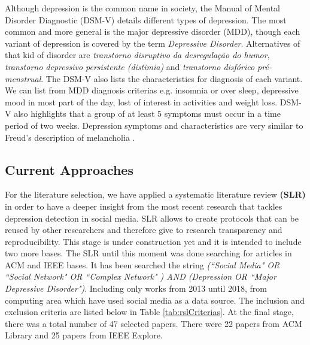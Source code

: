 \documentclass[11pt, notitlepage]{article} %
\begin{document}
Although depression is the common name in society, the Manual of Mental Disorder Diagnostic (DSM-V) details different types of depression. The most common and more general is the major depressive disorder (MDD), though each variant of depression is covered by the term \textit{Depressive Disorder}. Alternatives of that kid of disorder are \textit{transtorno disruptivo da desregulação do humor}, \textit{transtorno depressivo persistente (distimia)} and \textit{transtorno disfórico pré-menstrual}. The DSM-V also lists the characteristics for diagnosis of each variant. We can list from MDD diagnosis criterias e.g. insomnia or over sleep, depressive mood in most part of the day, lost of interest in activities and weight loss. DSM-V also highlights that a group of at least 5 symptoms must occur in a time period of two weeks.
Depression symptoms and characteristics are very similar to Freud's description of melancholia \cite{freud1917mourning}. 

\subsection{Current Approaches}\label{subsec:srl}
For the literature selection, we have applied a systematic literature review \textbf{(SLR)} in order to have a deeper insight from the most recent research that tackles depression detection in social media. 
SLR allows to create protocols that can be reused by other researchers and therefore give to research transparency and reproducibility.
This stage is under construction yet and it is intended to include two more bases. The SLR until this moment was done searching for articles in ACM and IEEE bases. It has been searched the string \textit{(``Social Media" OR ``Social Network" OR ``Complex Network" ) AND (Depression OR ``Major Depressive Disorder")}. Including only works from 2013 until 2018, from computing area which have used social media as a data source. The inclusion and exclusion criteria are listed below in Table \ref{tab:rslCriterias}. At the final stage, there was a total number of 47 selected papers. There were 22 papers from ACM Library and 25 papers from IEEE Explore.
\end{document}
